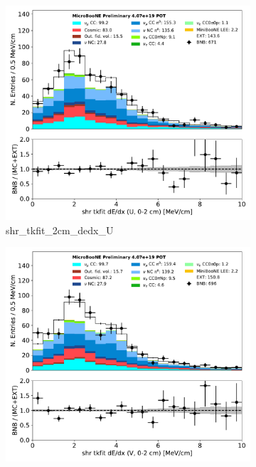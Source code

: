 \documentclass[a4paper]{article}
\begin{document}
\begin{figure}[H] 
\begin{center}
    \begin{subfigure}[b]{0.3\textwidth}
    \centering
    \includegraphics[width=1.00\textwidth]{1eNp/dataMCRun1/shr_tkfit_2cm_dedx_U01152020.pdf}
    \caption{\label{fig:1eNp:dataMCRun1:shr_tkfit_2cm_dedx_U} shr\_tkfit\_2cm\_dedx\_U }
    \end{subfigure}
    \begin{subfigure}[b]{0.3\textwidth}
    \centering
    \includegraphics[width=1.00\textwidth]{1eNp/dataMCRun1/shr_tkfit_2cm_dedx_V01152020.pdf}

\end{subfigure}
\end{center}
\end{figure}
\end{document}
